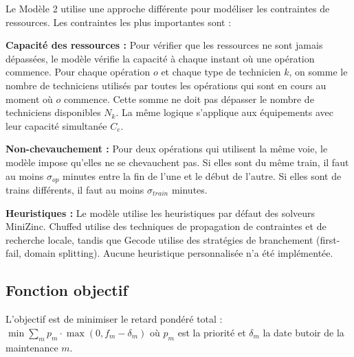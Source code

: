 Le Modèle 2 utilise une approche différente pour modéliser les contraintes de ressources. Les contraintes les plus importantes sont :

\textbf{Capacité des ressources :} Pour vérifier que les ressources ne sont jamais dépassées, le modèle vérifie la capacité à chaque instant où une opération commence. Pour chaque opération $o$ et chaque type de technicien $k$, on somme le nombre de techniciens utilisés par toutes les opérations qui sont en cours au moment où $o$ commence. Cette somme ne doit pas dépasser le nombre de techniciens disponibles $N_k$. La même logique s'applique aux équipements avec leur capacité simultanée $C_e$.

\textbf{Non-chevauchement :} Pour deux opérations qui utilisent la même voie, le modèle impose qu'elles ne se chevauchent pas. Si elles sont du même train, il faut au moins $\sigma_{op}$ minutes entre la fin de l'une et le début de l'autre. Si elles sont de trains différents, il faut au moins $\sigma_{train}$ minutes.

\textbf{Heuristiques :} Le modèle utilise les heuristiques par défaut des solveurs MiniZinc. Chuffed utilise des techniques de propagation de contraintes et de recherche locale, tandis que Gecode utilise des stratégies de branchement (first-fail, domain splitting). Aucune heuristique personnalisée n'a été implémentée.

\subsection{Fonction objectif}

L'objectif est de minimiser le retard pondéré total : $\min \sum_{m} p_m \cdot \max(0, f_m - \delta_m)$ où $p_m$ est la priorité et $\delta_m$ la date butoir de la maintenance $m$.

